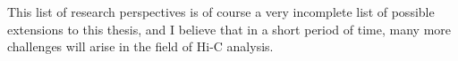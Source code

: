 This list of research perspectives is of course a very incomplete list of
possible extensions to this thesis, and I believe that in a short period of
time, many more challenges will arise in the field of Hi-C analysis.

